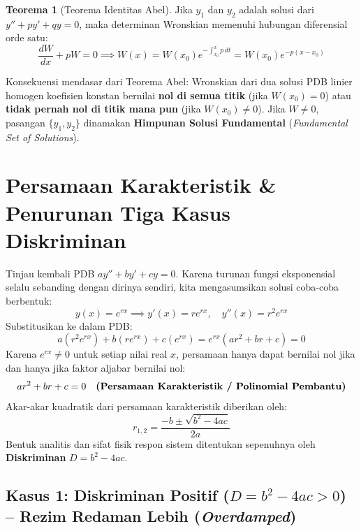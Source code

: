 \documentclass[11pt,a4paper]{article}
\theoremstyle{definition}
\newtheorem{theorem}{Teorema}[section]
\begin{document}
\begin{theorem}[Teorema Identitas Abel]
Jika $y_1$ dan $y_2$ adalah solusi dari $y'' + p y' + q y = 0$, maka determinan Wronskian memenuhi hubungan diferensial orde satu:
\begin{equation}
    \frac{dW}{dx} + p W = 0 \implies W(x) = W(x_0) e^{-\int_{x_0}^x p \, dt} = W(x_0) e^{-p (x - x_0)}
    \label{eq:abel_theorem}
\end{equation}
\end{theorem}

Konsekuensi mendasar dari Teorema Abel: Wronskian dari dua solusi PDB linier homogen koefisien konstan bernilai \textbf{nol di semua titik} (jika $W(x_0) = 0$) atau \textbf{tidak pernah nol di titik mana pun} (jika $W(x_0) \neq 0$). Jika $W \neq 0$, pasangan $\{y_1, y_2\}$ dinamakan \textbf{Himpunan Solusi Fundamental} (\textit{Fundamental Set of Solutions}).

\section{Persamaan Karakteristik \& Penurunan Tiga Kasus Diskriminan}

Tinjau kembali PDB $a y'' + b y' + c y = 0$. Karena turunan fungsi eksponensial selalu sebanding dengan dirinya sendiri, kita mengasumsikan solusi coba-coba berbentuk:
\begin{equation}
    y(x) = e^{rx} \implies y'(x) = r e^{rx}, \quad y''(x) = r^2 e^{rx}
\end{equation}
Substitusikan ke dalam PDB:
\begin{equation}
    a (r^2 e^{rx}) + b (r e^{rx}) + c (e^{rx}) = e^{rx} \left( a r^2 + b r + c \right) = 0
\end{equation}
Karena $e^{rx} \neq 0$ untuk setiap nilai real $x$, persamaan hanya dapat bernilai nol jika dan hanya jika faktor aljabar bernilai nol:
\begin{equation}
    a r^2 + b r + c = 0 \quad \text{\textbf{(Persamaan Karakteristik / Polinomial Pembantu)}}
    \label{eq:char_eq}
\end{equation}
Akar-akar kuadratik dari persamaan karakteristik diberikan oleh:
\begin{equation}
    r_{1,2} = \frac{-b \pm \sqrt{b^2 - 4ac}}{2a}
    \label{eq:quadratic_roots}
\end{equation}
Bentuk analitis dan sifat fisik respon sistem ditentukan sepenuhnya oleh \textbf{Diskriminan} $D = b^2 - 4ac$.

\subsection{Kasus 1: Diskriminan Positif (\texorpdfstring{$D = b^2 - 4ac > 0$}{D > 0}) -- Rezim Redaman Lebih (\textit{Overdamped})}
\end{document}
